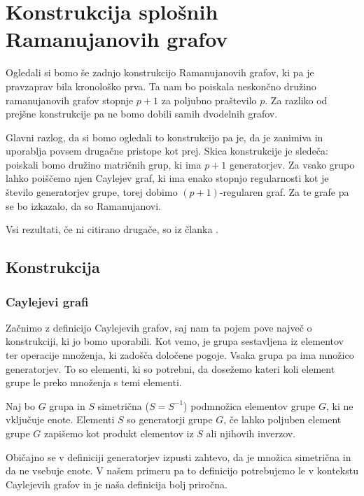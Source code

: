 \section{Konstrukcija splošnih Ramanujanovih grafov}
Ogledali si bomo še zadnjo konstrukcijo Ramanujanovih grafov, ki pa je pravzaprav bila kronološko prva. Ta nam bo poiskala neskončno družino ramanujanovih grafov stopnje \(p+1\) za poljubno praštevilo \(p\). Za razliko od prejšne konstrukcije pa ne bomo dobili samih dvodelnih grafov.

Glavni razlog, da si bomo ogledali to konstrukcijo pa je, da je zanimiva in uporablja povsem drugačne pristope kot prej. Skica konstrukcije je sledeča: poiskali bomo družino matričnih grup, ki ima \(p+1\) generatorjev. Za vsako grupo lahko poiščemo njen Caylejev graf, ki ima enako stopnjo regularnosti kot je število generatorjev grupe, torej dobimo \((p+1)\)-regularen graf. Za te grafe pa se bo izkazalo, da so Ramanujanovi.

Vsi rezultati, če ni citirano drugače, so iz članka \cite{lps-ramanujan}. %

\subsection{Konstrukcija}
\subsubsection{Caylejevi grafi}
Začnimo z definicijo Caylejevih grafov, saj nam ta pojem pove največ o konstrukciji, ki jo bomo uporabili. Kot vemo, je grupa sestavljena iz elementov ter operacije množenja, ki zadošča določene pogoje. Vsaka grupa pa ima množico generatorjev. To so elementi, ki so potrebni, da dosežemo kateri koli element grupe le preko množenja s temi elementi.

\begin{definicija}[Generatorji]
    Naj bo \(G\) grupa in \(S\) simetrična (\(S=S^{-1}\)) podmnožica elementov grupe \(G\), ki ne vključuje enote. Elementi \(S\) so generatorji grupe \(G\), če lahko poljuben element grupe \(G\) zapišemo kot produkt elementov iz \(S\) ali njihovih inverzov.
\end{definicija}
Običajno se v definiciji generatorjev izpusti zahtevo, da je množica simetrična in da ne vsebuje enote. V našem primeru pa to definicijo potrebujemo le v kontekstu Caylejevih grafov in je naša definicija bolj priročna.

